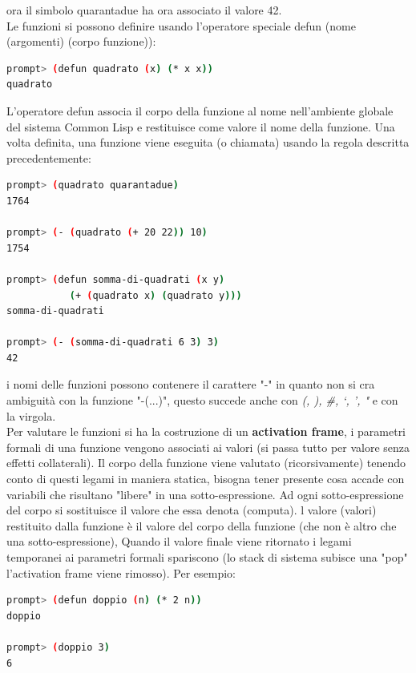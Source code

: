\documentclass[a4paper,12pt, oneside]{book}
\begin{document}
ora il simbolo quarantadue ha ora associato il valore 42.\\
Le funzioni si possono definire usando l'operatore speciale defun (nome (argomenti) (corpo funzione)):
\begin{shaded}
\begin{lstlisting}[language=bash]
prompt> (defun quadrato (x) (* x x))
quadrato
\end{lstlisting}
\end{shaded}
L'operatore defun associa il corpo della funzione al nome
nell'ambiente globale del sistema Common Lisp e restituisce come valore il nome della funzione. Una volta definita, una funzione viene eseguita (o chiamata) usando la regola descritta precedentemente:
\begin{shaded}
\begin{lstlisting}[language=bash]
prompt> (quadrato quarantadue)
1764

prompt> (- (quadrato (+ 20 22)) 10)
1754

prompt> (defun somma-di-quadrati (x y)
           (+ (quadrato x) (quadrato y)))
somma-di-quadrati

prompt> (- (somma-di-quadrati 6 3) 3)
42
\end{lstlisting}
\end{shaded}
i nomi delle funzioni possono contenere il carattere "-" in quanto non si cra ambiguità con la funzione "-(...)", questo succede anche con \textit{(, ), \#, ‘, ', "} e con la virgola.\\
Per valutare le funzioni si ha la costruzione di un \textbf{activation frame}, i parametri formali di una funzione vengono associati ai valori (si passa tutto per valore senza effetti collaterali). Il corpo della funzione viene valutato (ricorsivamente) tenendo conto di questi legami in maniera statica, bisogna tener presente cosa accade con variabili che risultano
"libere" in una sotto-espressione. Ad ogni sotto-espressione del corpo si sostituisce il valore che essa denota (computa). l valore (valori) restituito dalla funzione è il valore del corpo della funzione (che non è altro che una sotto-espressione), Quando il valore finale viene ritornato i legami temporanei ai parametri formali spariscono (lo stack di sistema subisce una "pop" l'activation frame viene rimosso). Per esempio:
\begin{shaded}
\begin{lstlisting}[language=bash]
prompt> (defun doppio (n) (* 2 n))
doppio

prompt> (doppio 3)
6
\end{lstlisting}
\end{shaded}
\end{document}
